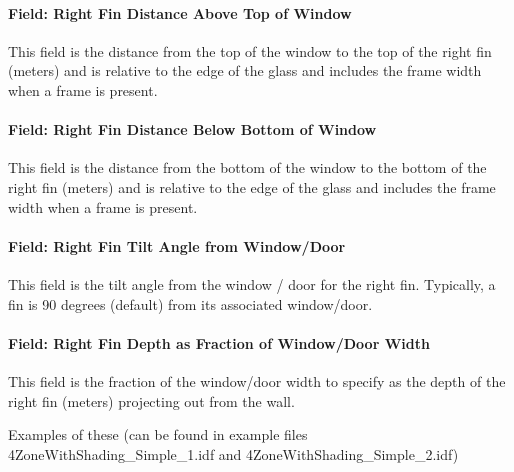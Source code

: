 \paragraph{Field: Right Fin Distance Above Top of Window}\label{field-right-fin-distance-above-top-of-window-1}

This field is the distance from the top of the window to the top of the right fin (meters) and is relative to the edge of the glass and includes the frame width when a frame is present.

\paragraph{Field: Right Fin Distance Below Bottom of Window}\label{field-right-fin-distance-below-bottom-of-window-1}

This field is the distance from the bottom of the window to the bottom of the right fin (meters) and is relative to the edge of the glass and includes the frame width when a frame is present.

\paragraph{Field: Right Fin Tilt Angle from Window/Door}\label{field-right-fin-tilt-angle-from-windowdoor-1}

This field is the tilt angle from the window / door for the right fin. Typically, a fin is 90 degrees (default) from its associated window/door.

\paragraph{Field: Right Fin Depth as Fraction of Window/Door Width}\label{field-right-fin-depth-as-fraction-of-windowdoor-width}

This field is the fraction of the window/door width to specify as the depth of the right fin (meters) projecting out from the wall.

Examples of these (can be found in example files 4ZoneWithShading\_Simple\_1.idf and 4ZoneWithShading\_Simple\_2.idf)


